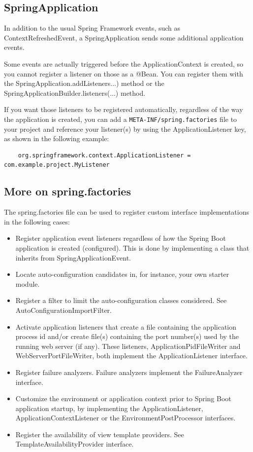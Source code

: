 \documentclass{scrartcl}
\begin{document}
\subsection{SpringApplication}

In addition to the usual Spring Framework events, such as ContextRefreshedEvent, a SpringApplication sends some additional application events.

Some events are actually triggered before the ApplicationContext is created, so you cannot register a listener on those as a @Bean. You can register them with the SpringApplication.addListeners...) method or the SpringApplicationBuilder.listeners(...) method.

If you want those listeners to be registered automatically, regardless of the way the application is created, you can add a \lstinline|META-INF/spring.factories| file to your project and reference your listener(s) by using the ApplicationListener key, as shown in the following example:

\begin{lstlisting}
    org.springframework.context.ApplicationListener = com.example.project.MyListener
\end{lstlisting}

\subsection{More on spring.factories}

The spring.factories file can be used to register custom interface implementations in the following cases:

\begin{itemize}
    \item Register application event listeners regardless of how the Spring Boot application is created (configured). This is done by implementing a class that inherits from SpringApplicationEvent.
    \item Locate auto-configuration candidates in, for instance, your own starter module.
    \item Register a filter to limit the auto-configuration classes considered. See AutoConfigurationImportFilter.
    \item  Activate application listeners that create a file containing the application process id and/or create file(s) containing the port number(s) used by the running web server (if any). These listeners, ApplicationPidFileWriter and WebServerPortFileWriter, both implement the ApplicationListener interface.
    \item Register failure analyzers. Failure analyzers implement the FailureAnalyzer interface.
    \item Customize the environment or application context prior to Spring Boot application startup, by implementing the ApplicationListener, ApplicationContextListener or the EnvironmentPostProcessor interfaces.
    \item Register the availability of view template providers. See TemplateAvailabilityProvider interface.
\end{itemize}
\end{document}

